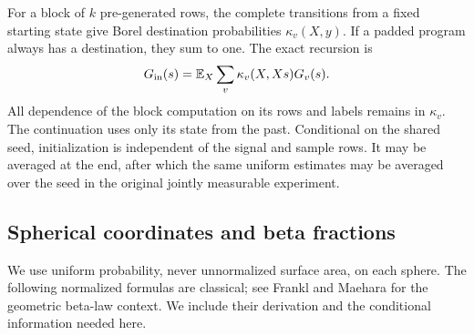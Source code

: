 For a block of \(k\) pre-generated rows, the complete transitions from
a fixed starting state give Borel destination probabilities
\(\kappa_v(X,y)\). If a padded program always has a destination, they
sum to one. The exact recursion is
\begin{equation}\label{s:recursion}
 G_{\rm in}(s)=
 \mathbb E_X\sum_v\kappa_v(X,Xs)G_v(s).
\end{equation}
All dependence of the block computation on its rows and labels remains
in \(\kappa_v\). The continuation uses only its state from the past.
Conditional on the shared seed, initialization is independent of the
signal and sample rows. It may be averaged at the end, after which the
same uniform estimates may be averaged over the seed in the original
jointly measurable experiment.

\subsection{Spherical coordinates and beta fractions}

We use uniform probability, never unnormalized surface area, on each
sphere. The following normalized formulas are classical; see Frankl
and Maehara \cite{FranklMaehara1990} for the geometric beta-law
context. We include their derivation and the conditional information
needed here.

